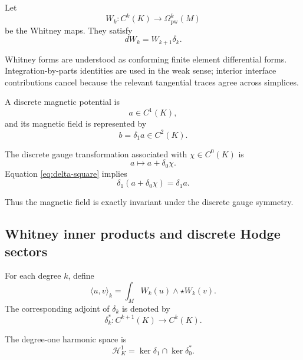 \documentclass[11pt]{article}
\theoremstyle{definition}
\theoremstyle{remark}
\begin{document}
Let
\begin{equation}
W_k:
C^k(K)
\longrightarrow
\Omega^k_{\mathrm{pw}}(M)
\end{equation}
be the Whitney maps. They satisfy
\begin{equation}
dW_k
=
W_{k+1}\delta_k.
\label{eq:whitney-commutation}
\end{equation}

Whitney forms are understood as conforming finite element
differential forms. Integration-by-parts identities are used
in the weak sense; interior interface contributions cancel
because the relevant tangential traces agree across simplices.

A discrete magnetic potential is
\begin{equation}
a\in C^1(K),
\end{equation}
and its magnetic field is represented by
\begin{equation}
b=\delta_1a\in C^2(K).
\label{eq:magnetic-cochain}
\end{equation}

The discrete gauge transformation associated with
\(\chi\in C^0(K)\) is
\begin{equation}
a\longmapsto a+\delta_0\chi.
\label{eq:gauge-transformation}
\end{equation}
Equation \eqref{eq:delta-square} implies
\begin{equation}
\delta_1(a+\delta_0\chi)
=
\delta_1a.
\label{eq:magnetic-invariance}
\end{equation}

Thus the magnetic field is exactly invariant under the
discrete gauge symmetry.

\subsection{Whitney inner products and discrete Hodge sectors}

For each degree \(k\), define
\begin{equation}
\langle u,v\rangle_k
=
\int_M
W_k(u)\wedge\star W_k(v).
\label{eq:whitney-inner}
\end{equation}
The corresponding adjoint of \(\delta_k\) is denoted by
\begin{equation}
\delta_k^\ast:
C^{k+1}(K)
\longrightarrow
C^k(K).
\end{equation}

The degree-one harmonic space is
\begin{equation}
\mathcal H_K^1
=
\ker\delta_1
\cap
\ker\delta_0^\ast.
\label{eq:harmonic}
\end{equation}
\end{document}
